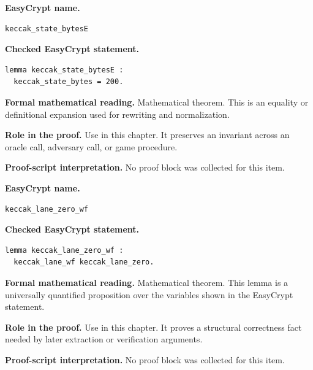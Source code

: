 \begin{formaltheorem}
\noindent\textbf{EasyCrypt name.}
\begin{lstlisting}[language=EasyCrypt,basicstyle=\ttfamily\scriptsize]
keccak_state_bytesE
\end{lstlisting}
\noindent\textbf{Checked EasyCrypt statement.}
\begin{lstlisting}[language=EasyCrypt,basicstyle=\ttfamily\scriptsize]
lemma keccak_state_bytesE :
  keccak_state_bytes = 200.
\end{lstlisting}
\noindent\textbf{Formal mathematical reading.}
Mathematical theorem. This is an equality or definitional expansion used for rewriting and normalization.

\noindent\textbf{Role in the proof.}
Use in this chapter. It preserves an invariant across an oracle call, adversary call, or game procedure.

\noindent\textbf{Proof-script interpretation.}
No proof block was collected for this item.

\end{formaltheorem}

\begin{formaltheorem}
\noindent\textbf{EasyCrypt name.}
\begin{lstlisting}[language=EasyCrypt,basicstyle=\ttfamily\scriptsize]
keccak_lane_zero_wf
\end{lstlisting}
\noindent\textbf{Checked EasyCrypt statement.}
\begin{lstlisting}[language=EasyCrypt,basicstyle=\ttfamily\scriptsize]
lemma keccak_lane_zero_wf :
  keccak_lane_wf keccak_lane_zero.
\end{lstlisting}
\noindent\textbf{Formal mathematical reading.}
Mathematical theorem. This lemma is a universally quantified proposition over the variables shown in the EasyCrypt statement.

\noindent\textbf{Role in the proof.}
Use in this chapter. It proves a structural correctness fact needed by later extraction or verification arguments.

\noindent\textbf{Proof-script interpretation.}
No proof block was collected for this item.

\end{formaltheorem}

